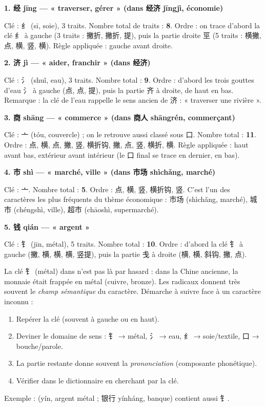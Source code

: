 \documentclass[11pt]{article}
\newcommand{\cle}[1]{{\popxbold\color{popdark}#1}}
\newcounter{popsec}
\newcounter{popsub}
\newcommand{\courssub}[1]{%
  \stepcounter{popsub}%
  \par\vspace{9pt}\noindent{\popxbold\fontsize{11.5}{13}\selectfont\color{popink}{\color{poporange}\thepopsec.\thepopsub}\hspace{6pt}#1}\par\nopagebreak\vspace{4pt}
}
\newcommand{\zh}[1]{\ifmmode\text{#1}\else{#1}\fi}
\begin{document}
\courssub{Étude caractère par caractère}

\textbf{1. 经 jīng — « traverser, gérer » (dans 经济 jīngjì, économie)}\par
Clé : \cle{纟} (sī, soie), 3 traits. Nombre total de traits : \textbf{8}.
Ordre : on trace d'abord la clé 纟 à gauche (3 traits : 撇折, 撇折, 提), puis la partie droite 巠 (5 traits : 横撇, 点, 横, 竖, 横).
Règle appliquée : gauche avant droite.

\textbf{2. 济 jì — « aider, franchir » (dans 经济)}\par
Clé : \cle{氵} (shuǐ, eau), 3 traits. Nombre total : \textbf{9}.
Ordre : d'abord les trois gouttes d'eau 氵 à gauche (点, 点, 提), puis la partie 齐 à droite, de haut en bas.
Remarque : la clé de l'eau rappelle le sens ancien de 济 : « traverser une rivière ».

\textbf{3. 商 shāng — « commerce » (dans 商人 shāngrén, commerçant)}\par
Clé : \cle{亠} (tóu, couvercle) ; on le retrouve aussi classé sous 口. Nombre total : \textbf{11}.
Ordre : 点, 横, 点, 撇, 竖, 横折钩, 撇, 点, 竖, 横折, 横.
Règle appliquée : haut avant bas, extérieur avant intérieur (le 口 final se trace en dernier, en bas).

\textbf{4. 市 shì — « marché, ville » (dans 市场 shìchǎng, marché)}\par
Clé : \cle{亠}. Nombre total : \textbf{5}.
Ordre : 点, 横, 竖, 横折钩, 竖.
C'est l'un des caractères les plus fréquents du thème économique : 市场 (shìchǎng, marché), 城市 (chéngshì, ville), 超市 (chāoshì, supermarché).

\textbf{5. 钱 qián — « argent »}\par
Clé : \cle{钅} (jīn, métal), 5 traits. Nombre total : \textbf{10}.
Ordre : d'abord la clé 钅 à gauche (撇, 横, 横, 横, 竖提), puis la partie 戋 à droite (横, 横, 斜钩, 撇, 点).

\begin{methode}
La clé 钅 (métal) dans \zh{钱} n'est pas là par hasard : dans la Chine ancienne, la monnaie était frappée en métal (cuivre, bronze). Les radicaux donnent très souvent le \emph{champ sémantique} du caractère. Démarche à suivre face à un caractère inconnu :
\begin{enumerate}
\item Repérer la clé (souvent à gauche ou en haut).
\item Deviner le domaine de sens : 钅 → métal, 氵 → eau, 纟 → soie/textile, 口 → bouche/parole.
\item La partie restante donne souvent la \emph{prononciation} (composante phonétique).
\item Vérifier dans le dictionnaire en cherchant par la clé.
\end{enumerate}
Exemple : \zh{银} (yín, argent métal ; 银行 yínháng, banque) contient aussi 钅.
\end{methode}
\end{document}
